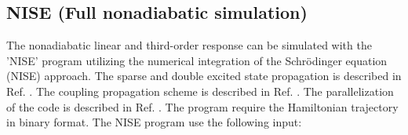 \subsection{NISE (Full nonadiabatic simulation)}
The nonadiabatic linear and third-order response can be simulated with the 'NISE' program utilizing the numerical integration of the Schr\"odinger equation (NISE) approach\cite{Jansen.2006.JPCB.110.22910,Jansen.2009.ACR.42.1405}. The sparse and double excited state propagation is described in Ref. .
The coupling propagation scheme is described in Ref. . The parallelization of the code is described in Ref. .
The program require the Hamiltonian trajectory in binary format.
The NISE program use the following input:\\
